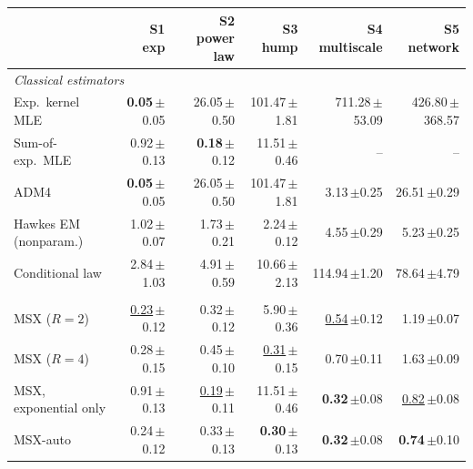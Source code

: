 \begin{tabular}{lrrrrr}
\toprule
& S1 exp & S2 power law & S3 hump & S4 multiscale & S5 network \\
\midrule
\multicolumn{6}{l}{\textit{Classical estimators}} \\[1pt]
\quad Exp.\ kernel MLE & \textbf{0.05}{\scriptsize\,$\pm$0.05} & 26.05{\scriptsize\,$\pm$0.50} & 101.47{\scriptsize\,$\pm$1.81} & 711.28{\scriptsize\,$\pm$53.09} & 426.80{\scriptsize\,$\pm$368.57} \\
\quad Sum-of-exp.\ MLE & 0.92{\scriptsize\,$\pm$0.13} & \textbf{0.18}{\scriptsize\,$\pm$0.12} & 11.51{\scriptsize\,$\pm$0.46} & -- & -- \\
\quad ADM4 & \textbf{0.05}{\scriptsize\,$\pm$0.05} & 26.05{\scriptsize\,$\pm$0.50} & 101.47{\scriptsize\,$\pm$1.81} & 3.13{\scriptsize\,$\pm$0.25} & 26.51{\scriptsize\,$\pm$0.29} \\
\quad Hawkes EM (nonparam.) & 1.02{\scriptsize\,$\pm$0.07} & 1.73{\scriptsize\,$\pm$0.21} & 2.24{\scriptsize\,$\pm$0.12} & 4.55{\scriptsize\,$\pm$0.29} & 5.23{\scriptsize\,$\pm$0.25} \\
\quad Conditional law & 2.84{\scriptsize\,$\pm$1.03} & 4.91{\scriptsize\,$\pm$0.59} & 10.66{\scriptsize\,$\pm$2.13} & 114.94{\scriptsize\,$\pm$1.20} & 78.64{\scriptsize\,$\pm$4.79} \\
\addlinespace[3pt]\multicolumn{6}{l}{\textit{Ours}} \\[1pt]
\rowcolor{oursbg} \quad MSX ($R=2$) & \underline{0.23}{\scriptsize\,$\pm$0.12} & 0.32{\scriptsize\,$\pm$0.12} & 5.90{\scriptsize\,$\pm$0.36} & \underline{0.54}{\scriptsize\,$\pm$0.12} & 1.19{\scriptsize\,$\pm$0.07} \\
\rowcolor{oursbg} \quad MSX ($R=4$) & 0.28{\scriptsize\,$\pm$0.15} & 0.45{\scriptsize\,$\pm$0.10} & \underline{0.31}{\scriptsize\,$\pm$0.15} & 0.70{\scriptsize\,$\pm$0.11} & 1.63{\scriptsize\,$\pm$0.09} \\
\rowcolor{oursbg} \quad MSX, exponential only & 0.91{\scriptsize\,$\pm$0.13} & \underline{0.19}{\scriptsize\,$\pm$0.11} & 11.51{\scriptsize\,$\pm$0.46} & \textbf{0.32}{\scriptsize\,$\pm$0.08} & \underline{0.82}{\scriptsize\,$\pm$0.08} \\
\rowcolor{oursbg} \quad MSX-auto & 0.24{\scriptsize\,$\pm$0.12} & 0.33{\scriptsize\,$\pm$0.13} & \textbf{0.30}{\scriptsize\,$\pm$0.13} & \textbf{0.32}{\scriptsize\,$\pm$0.08} & \textbf{0.74}{\scriptsize\,$\pm$0.10} \\
\bottomrule
\end{tabular}